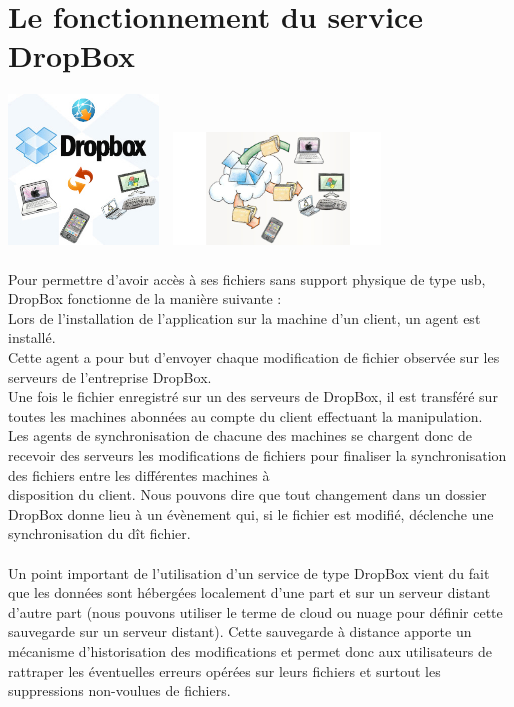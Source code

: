 \documentclass[a4paper, 10pt]{article}
\begin{document}
\section*{Le fonctionnement du service DropBox}
\includegraphics[height = 4cm, width = 4cm]{jpg/dropbox_1.png}
\includegraphics[height = 3cm, width = 6cm]{jpg/dropbox_3.jpg}\\ \\
Pour permettre d'avoir acc\`es \`a ses fichiers sans support physique de type usb, DropBox fonctionne de la mani\`ere suivante :\\
Lors de l'installation de l'application sur la machine d'un client, un agent est install\'e.\\
Cette agent a pour but d'envoyer chaque modification de fichier observ\'ee sur les serveurs de l'entreprise DropBox.\\
Une fois le fichier enregistr\'e sur un des serveurs de DropBox, il est transf\'er\'e sur toutes les machines abonn\'ees
au compte du client effectuant la manipulation.\\
Les agents de synchronisation de chacune des machines se chargent donc de recevoir des serveurs les modifications de fichiers pour
finaliser la synchronisation des fichiers entre les diff\'erentes machines \`a\\disposition du client.
Nous pouvons dire que tout changement dans un dossier DropBox donne lieu \`a un \'ev\`enement qui, si le fichier est modifi\'e,
d\'eclenche une synchronisation du d\^it fichier.\\ \\
Un point important de l'utilisation d'un service de type DropBox vient du fait que les donn\'ees sont h\'eberg\'ees localement d'une part
et sur un serveur distant d'autre part (nous pouvons utiliser le terme de cloud ou nuage pour d\'efinir cette sauvegarde sur un serveur distant).
Cette sauvegarde \`a distance apporte un m\'ecanisme d'historisation des modifications et 
permet donc aux utilisateurs de rattraper les \'eventuelles erreurs op\'er\'ees sur leurs fichiers et
surtout les suppressions non-voulues de fichiers.
\end{document}
